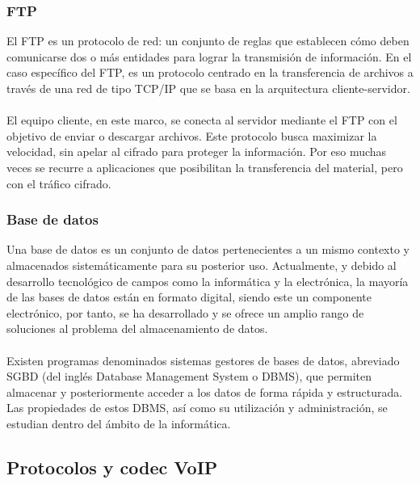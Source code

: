 \documentclass[12pt,letterpaper]{article}
\begin{document}
\subsubsection{FTP}
El FTP es un protocolo de red: un conjunto de reglas que establecen cómo deben comunicarse 
dos o más entidades para lograr la transmisión de información. En el caso específico del 
FTP, es un protocolo centrado en la transferencia de archivos a través de una red de tipo 
TCP/IP que se basa en la arquitectura cliente-servidor.
\\ \\ 
El equipo cliente, en este marco, se conecta al servidor mediante el FTP con el objetivo 
de enviar o descargar archivos. Este protocolo busca maximizar la velocidad, sin apelar 
al cifrado para proteger la información. Por eso muchas veces se recurre a aplicaciones 
que posibilitan la transferencia del material, pero con el tráfico cifrado. \cite{ftp}

\subsubsection{Base de datos}
Una base de datos es un conjunto de datos pertenecientes a un mismo contexto y almacenados 
sistemáticamente para su posterior uso. Actualmente, y debido al desarrollo tecnológico de 
campos como la informática y la electrónica, la mayoría de las bases de datos están en 
formato digital, siendo este un componente electrónico, por tanto, se ha desarrollado y 
se ofrece un amplio rango de soluciones al problema del almacenamiento de datos.
\\ \\ 
Existen programas denominados sistemas gestores de bases de datos, abreviado SGBD (del 
inglés Database Management System o DBMS), que permiten almacenar y posteriormente acceder 
a los datos de forma rápida y estructurada. Las propiedades de estos DBMS, así como su 
utilización y administración, se estudian dentro del ámbito de la informática. \cite{basedatos}

\subsection{Protocolos y codec VoIP}
\end{document}
